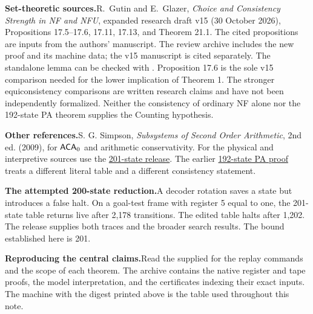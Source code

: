 \documentclass[10pt,a4paper]{article}
\newcommand{\id}[1]{\texttt{\small\detokenize{#1}}}
\newcommand{\shd}[1]{\par\textbf{#1}\enspace}
\newcommand{\relurl}{https://github.com/wlad-svennik/notes/releases/tag/counting201-zermelo}
\begin{document}
\shd{Set-theoretic sources.}R.~Gutin and E.~Glazer, \emph{Choice and Consistency Strength in NF and NFU}, expanded research draft v15 (30 October 2026), Propositions 17.5--17.6, 17.11, 17.13, and Theorem 21.1. The cited propositions are inputs from the authors' manuscript. The review archive includes the new proof and its machine data; the v15 manuscript is cited separately. The standalone lemma can be checked with \id{lean src/InitialSegment.lean}. Proposition 17.6 is the sole v15 comparison needed for the lower implication of Theorem 1. The stronger equiconsistency comparisons are written research claims and have not been independently formalized. Neither the consistency of ordinary NF alone nor the 192-state PA theorem supplies the Counting hypothesis.

\shd{Other references.}S. G. Simpson, \emph{Subsystems of Second Order Arithmetic}, 2nd ed. (2009), for $\mathsf{ACA}_0$ and arithmetic conservativity. For the physical and interpretive sources use the \href{\relurl}{201-state release}. The earlier \href{https://github.com/wlad-svennik/notes/releases/tag/nf192-pa}{192-state PA proof} treats a different literal table and a different consistency statement.

\shd{The attempted 200-state reduction.}A decoder rotation saves a state but introduces a false halt. On a goal-test frame with register 5 equal to one, the 201-state table returns live after 2,178 transitions. The edited table halts after 1,202. The release supplies both traces and the broader search results. The bound established here is 201.\par
\shd{Reproducing the central claims.}Read the supplied \id{README.md} for the replay commands and the scope of each theorem. The archive contains the native register and tape proofs, the model interpretation, and the certificates indexing their exact inputs. The machine with the digest printed above is the table used throughout this note.
\end{document}
